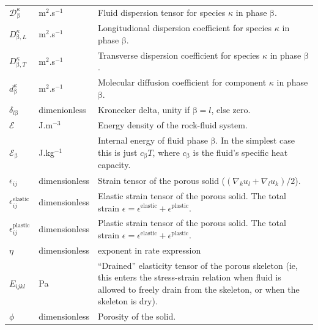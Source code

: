 \documentclass[12pt]{report}
\def\species{\kappa}
\def\phase{\mathrm{\beta}}
\def\energydens{\mathcal{E}}
\begin{document}
\begin{longtable}{llp{10cm}}
${\mathcal{D}}_{\phase}^{\species}$ & m$^{2}$.s$^{-1}$ & Fluid
dispersion tensor for species $\species$ in phase $\phase$. \\

$D_{\phase,L}^{\species}$ & m$^{2}$.s$^{-1}$ & Longitudional
dispersion coefficient for species $\species$ in phase $\phase$. \\

$D_{\phase,T}^{\species}$ & m$^{2}$.s$^{-1}$ & Transverse
dispersion coefficient for species $\species$ in phase $\phase$. \\

$d_{\phase}^{\species}$ & m$^{2}$.s$^{-1}$ & Molecular diffusion
coefficient for component $\species$ in phase $\phase$. \\

$\delta_{l \phase}$ & dimenionless & Kronecker delta, unity if $\phase
=l$, else zero. \\

$\energydens$ & J.m$^{-3}$ & Energy density of the rock-fluid
system. \\

$\energydens_{\phase}$ & J.kg$^{-1}$ & Internal energy of fluid phase
$\phase$. In the simplest case this is just $c_{\phase}T$, where
$c_{\phase}$ is the fluid's specific heat capacity.\\

$\epsilon_{ij}$ & dimensionless & Strain tensor of the porous solid
($(\nabla_{k}u_{l} + \nabla_{l}u_{k})/2$). \\

$\epsilon^{\mathrm{elastic}}_{ij}$ & dimensionless & Elastic strain
tensor of the porous solid.  The total strain $\epsilon =
\epsilon^{\mathrm{elastic}} + \epsilon^{\mathrm{plastic}}$. \\

$\epsilon^{\mathrm{plastic}}_{ij}$ & dimensionless & Plastic strain
tensor of the porous solid.  The total strain $\epsilon =
\epsilon^{\mathrm{elastic}} + \epsilon^{\mathrm{plastic}}$. \\

$\eta$ & dimensionless & exponent in rate expression \\

$E_{ijkl}$ & Pa & ``Drained'' elasticity tensor of the porous skeleton
(ie, this enters the stress-strain relation when fluid is allowed to
freely drain from the skeleton, or when the skeleton is dry). \\

$\phi$ & dimensionless & Porosity of the solid. \\


\end{longtable}
\end{document}
